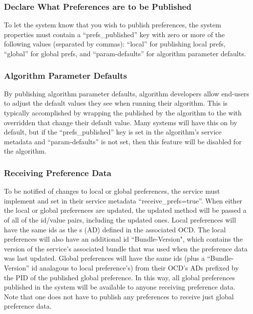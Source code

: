 \subsubsection*{Declare What Preferences are to be Published} To let the system
know that you wish to publish preferences, the system properties must contain a
``prefs\_published'' key with zero or more of the following values (separated by
commas): ``local'' for publishing local prefs, ``global'' for global prefs, and
``param-defaults'' for algorithm parameter defaults.

\subsubsection*{Algorithm Parameter Defaults} By publishing algorithm parameter
defaults, algorithm developers allow end-users to adjust the default values they
see when running their algorithm. This is typically accomplished by wrapping the
 published by the algorithm to the
 with overridden  that
change their default value. Many systems will have this on by default, but if
the ``prefs\_published'' key is set in the algorithm's service metadata and
``param-defaults'' is not set, then this feature will be disabled for the
algorithm.

\subsubsection*{Receiving Preference Data} To be notified of changes to local or
global preferences, the service must implement
 and set in their service
metadata ``receive\_prefs=true''. When either the local or global preferences are updated,
the updated method will be passed a  of all of the id/value
pairs, including the updated ones. Local preferences will have the same ids as
the s (AD) defined in the associated OCD. The local
preferences will also have an additional id ``Bundle-Version", which contains the
version of the service's associated bundle that was used when the preference data
was last updated. Global preferences will have the same ids (plus a
``Bundle-Version'' id analagous to local preference's) from their OCD's ADs
prefixed by the PID of the published global preference. In this way, all global
preferences published in the system will be available to anyone receiving
preference data. Note that one does not have to publish any preferences to
receive just global preference data.

